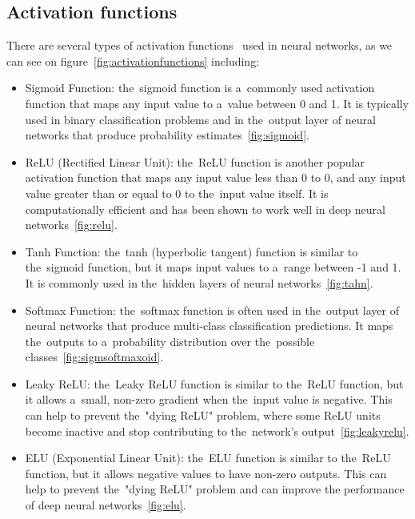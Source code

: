     \subsection{Activation functions} \label{subsec:nnaf}
    There are several types of activation functions~\cite{geron2022hands} used in neural networks, as we can see on figure~\ref{fig:activationfunctions} including:
    \begin{itemize}
        \item Sigmoid Function: the~sigmoid function is a~commonly used activation function that maps any input value to a~value between 0 and 1. It is typically used in binary classification problems and in the~output layer of neural networks that produce probability estimates~\ref{fig:sigmoid}.
        \item ReLU (Rectified Linear Unit): the~ReLU function is another popular activation function that maps any input value less than 0 to 0, and any input value greater than or equal to 0 to the~input value itself. It is computationally efficient and has been shown to work well in deep neural networks~\ref{fig:relu}.
        \item Tanh Function: the~tanh (hyperbolic tangent) function is similar to the~sigmoid function, but it maps input values to a~range between -1 and 1. It is commonly used in the~hidden layers of neural networks~\ref{fig:tahn}.
        \item Softmax Function: the~softmax function is often used in the~output layer of neural networks that produce multi-class classification predictions. It maps the~outputs to a~probability distribution over the~possible classes~\ref{fig:sigmsoftmaxoid}.
        \item Leaky ReLU: the~Leaky ReLU function is similar to the~ReLU function, but it allows a~small, non-zero gradient when the~input value is negative. This can help to prevent the~"dying ReLU" problem, where some ReLU units become inactive and stop contributing to the~network's output~\ref{fig:leakyrelu}.
        \item ELU (Exponential Linear Unit): the~ELU function is similar to the~ReLU function, but it allows negative values to have non-zero outputs. This can help to prevent the~"dying ReLU" problem and can improve the performance of deep neural networks~\ref{fig:elu}.
    \end{itemize}
    
